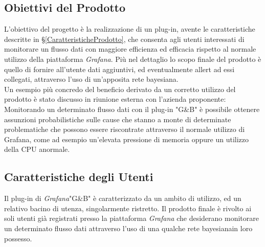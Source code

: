 \subsection{Obiettivi del Prodotto}\label{ObiettiviProdotto}
L'obiettivo del progetto è la realizzazione di un plug-in, avente le caratteristiche descritte in §\ref{CaratteristicheProdotto}, che consenta agli utenti interessati di monitorare un flusso dati con maggiore efficienza ed efficacia rispetto al normale utilizzo della piattaforma \textit{Grafana}\glossario. Più nel dettaglio lo scopo finale del prodotto è quello di fornire all'utente dati aggiuntivi, ed eventualmente allert ad essi collegati, attraverso l'uso di un'apposita rete bayesiana\glossario.\\
Un esempio più concredo del beneficio derivato da un corretto utilizzo del prodotto è stato discusso in riunione esterna con l'azienda proponente: Monitorando un determinato flusso dati con il plug-in "G\&B" è possibile ottenere assunzioni probabilistiche sulle cause che stanno a monte di determinate problematiche che possono essere riscontrate attraverso il normale utilizzo di Grafana, come ad esempio un'elevata pressione di memoria oppure un utilizzo della CPU anormale.

\subsection{Caratteristiche degli Utenti}\label{CaratteristicheUtenti}
Il plug-in di \textit{Grafana}\glossario "G\&B" è caratterizzato da un ambito di utilizzo, ed un relativo bacino di utenza, singolarmente ristretto. Il prodotto finale è rivolto ai soli utenti già registrati presso la piattaforma \textit{Grafana} che desiderano monitorare un determinato flusso dati attraverso l'uso di una qualche rete bayesiana\glossario in loro possesso.

